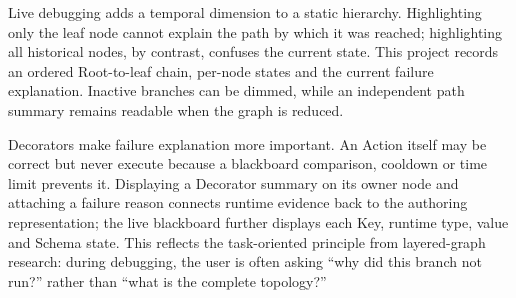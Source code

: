 Live debugging adds a temporal dimension to a static hierarchy. Highlighting only the leaf node cannot explain the path by which it was reached; highlighting all historical nodes, by contrast, confuses the current state. This project records an ordered Root-to-leaf chain, per-node states and the current failure explanation. Inactive branches can be dimmed, while an independent path summary remains readable when the graph is reduced.

Decorators make failure explanation more important. An Action itself may be correct but never execute because a blackboard comparison, cooldown or time limit prevents it. Displaying a Decorator summary on its owner node and attaching a failure reason connects runtime evidence back to the authoring representation; the live blackboard further displays each Key, runtime type, value and Schema state. This reflects the task-oriented principle from layered-graph research: during debugging, the user is often asking ``why did this branch not run?'' rather than ``what is the complete topology?''
